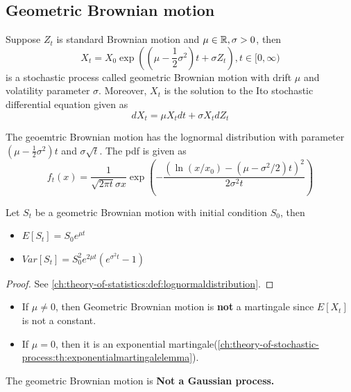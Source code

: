 \begin{refsection}
\subsection{Geometric Brownian motion}
\begin{definition}
	Suppose $Z_t$ is standard Brownian motion and $\mu\in \mathbb{R}, \sigma > 0$, then 
	$$X_t = X_0\exp((\mu - \frac{1}{2}\sigma^2)t + \sigma Z_t), t\in [0,\infty)$$ 
	is a stochastic process called geometric Brownian motion with drift $\mu$ and volatility parameter $\sigma$.
	Moreover, $X_t$ is the solution to the Ito stochastic differential equation given as
	$$dX_t = \mu X_t dt + \sigma X_t dZ_t$$
\end{definition}

\begin{lemma}[distribution]
	The geoemtric Brownian motion has the lognormal distribution with parameter $(\mu-\frac{1}{2}\sigma^2)t$ and $\sigma \sqrt{t}$. The pdf is given as
	$$f_t(x) = \frac{1}{\sqrt{2\pi t}\sigma x} \exp(-\frac{(\ln(x/x_0) - (\mu - \sigma^2/2)t)^2}{2\sigma^2 t})$$
\end{lemma}

\begin{lemma}
	Let $S_t$ be a geometric Brownian motion with initial condition $S_0$, then
	\begin{itemize}
		\item $E[S_t] = S_0e^{\mu t}$
		\item $Var[S_t] = S_0^2 e^{2\mu t}(e^{\sigma^2 t} - 1)$
	\end{itemize}
\end{lemma}
\begin{proof}
	See \autoref{ch:theory-of-statistics:def:lognormaldistribution}.
\end{proof}

\begin{remark}\hfill
	\begin{itemize}
		\item If $\mu\neq 0$, then Geometric Brownian motion is \textbf{not} a martingale since $E[X_t]$ is not a constant.
		\item If $\mu = 0$, then it is an exponential martingale(\autoref{ch:theory-of-stochastic-process:th:exponentialmartingalelemma}).
	\end{itemize}
\end{remark}

\begin{remark}
	The geometric Brownian motion is \textbf{Not a Gaussian process.}
\end{remark}


\end{refsection}
